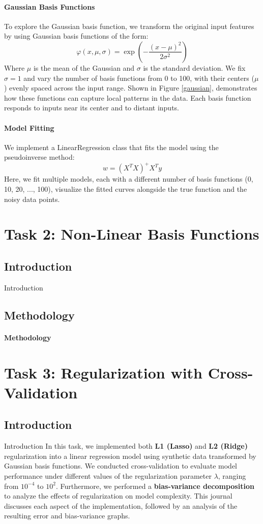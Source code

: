 \documentclass{article}
\begin{document}
\paragraph{Gaussian Basis Functions}
To explore the Gaussian basis function, we transform the original input features by using Gaussian basis functions of the form:
\[
\varphi(x, \mu, \sigma) = \exp\left(-\frac{(x - \mu)^2}{2\sigma^2}\right)
\]
Where $\mu$ is the mean of the Gaussian and $\sigma$ is the standard deviation. We fix $\sigma = 1$ and vary the number of basis functions from 0 to 100, with their centers ($\mu$) evenly spaced across the input range. Shown in Figure \ref{gaussian}, demonstrates how these functions can capture local patterns in the data. Each basis function responds to inputs near its center and to distant inputs.

\paragraph{Model Fitting}
We implement a LinearRegression class that fits the model using the pseudoinverse method:
\[
w = (X^T X)^+ X^T y
\]
Here, we fit multiple models, each with a different number of basis functions (0, 10, 20, ..., 100),  visualize the fitted curves alongside the true function and the noisy data points.

\section{Task 2: Non-Linear Basis Functions}

\subsection{Introduction}
\noindent Introduction


\subsection{Methodology}
\paragraph{Methodology}


\section{Task 3: Regularization with Cross-Validation}

\subsection{Introduction}
\noindent Introduction
In this task, we implemented both \textbf{L1 (Lasso)} and \textbf{L2 (Ridge)} regularization into a linear regression model using synthetic data transformed by Gaussian basis functions. We conducted cross-validation to evaluate model performance under different values of the regularization parameter $\lambda$, ranging from $10^{-4}$ to $10^2$. Furthermore, we performed a \textbf{bias-variance decomposition} to analyze the effects of regularization on model complexity. This journal discusses each aspect of the implementation, followed by an analysis of the resulting error and bias-variance graphs.
\end{document}
